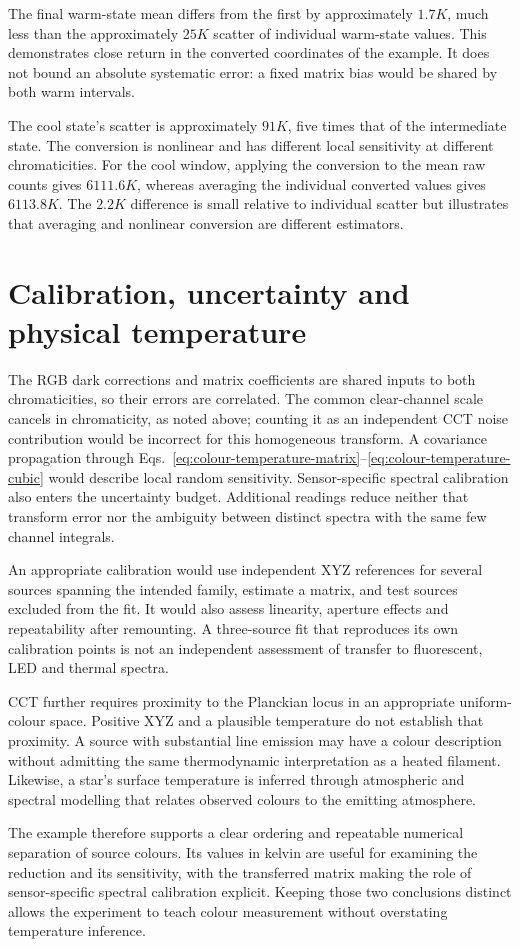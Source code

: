 The final warm-state mean differs from the first by approximately $1.7\unit{K}$, much less than the approximately $25\unit{K}$ scatter of individual warm-state values. This demonstrates close return in the converted coordinates of the example. It does not bound an absolute systematic error: a fixed matrix bias would be shared by both warm intervals.

The cool state's scatter is approximately $91\unit{K}$, five times that of the intermediate state. The conversion is nonlinear and has different local sensitivity at different chromaticities. For the cool window, applying the conversion to the mean raw counts gives $6111.6\unit{K}$, whereas averaging the individual converted values gives $6113.8\unit{K}$. The $2.2\unit{K}$ difference is small relative to individual scatter but illustrates that averaging and nonlinear conversion are different estimators.

\section{Calibration, uncertainty and physical temperature}
The RGB dark corrections and matrix coefficients are shared inputs to both chromaticities, so their errors are correlated. The common clear-channel scale cancels in chromaticity, as noted above; counting it as an independent CCT noise contribution would be incorrect for this homogeneous transform. A covariance propagation through Eqs.~\eqref{eq:colour-temperature-matrix}--\eqref{eq:colour-temperature-cubic} would describe local random sensitivity. Sensor-specific spectral calibration also enters the uncertainty budget. Additional readings reduce neither that transform error nor the ambiguity between distinct spectra with the same few channel integrals.

An appropriate calibration would use independent XYZ references for several sources spanning the intended family, estimate a matrix, and test sources excluded from the fit. It would also assess linearity, aperture effects and repeatability after remounting. A three-source fit that reproduces its own calibration points is not an independent assessment of transfer to fluorescent, LED and thermal spectra.

CCT further requires proximity to the Planckian locus in an appropriate uniform-colour space. Positive XYZ and a plausible temperature do not establish that proximity. A source with substantial line emission may have a colour description without admitting the same thermodynamic interpretation as a heated filament. Likewise, a star's surface temperature is inferred through atmospheric and spectral modelling that relates observed colours to the emitting atmosphere.

The example therefore supports a clear ordering and repeatable numerical separation of source colours. Its values in kelvin are useful for examining the reduction and its sensitivity, with the transferred matrix making the role of sensor-specific spectral calibration explicit. Keeping those two conclusions distinct allows the experiment to teach colour measurement without overstating temperature inference.
